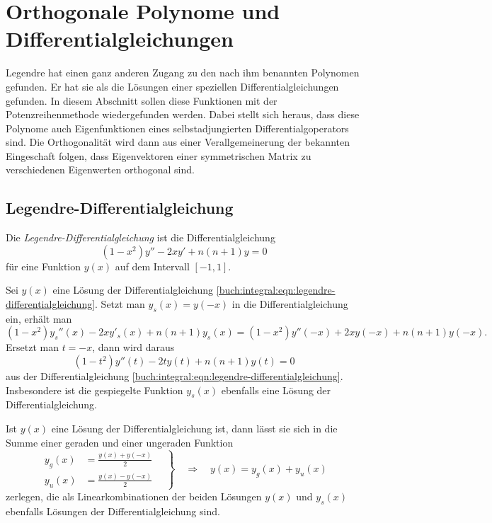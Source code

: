 %
%
%
\section{Orthogonale Polynome und Differentialgleichungen
\label{buch:orthogonal:section:orthogonale-polynome-und-dgl}}
Legendre hat einen ganz anderen Zugang zu den nach ihm benannten
Polynomen gefunden.
Er hat sie als die Lösungen einer speziellen Differentialgleichungen
gefunden.
In diesem Abschnitt sollen diese Funktionen mit der Potenzreihenmethode
wiedergefunden werden.
Dabei stellt sich heraus, dass diese Polynome auch Eigenfunktionen eines
selbstadjungierten Differentialgoperators sind.
Die Orthogonalität wird dann aus einer Verallgemeinerung der bekannten
Eingeschaft folgen, dass Eigenvektoren einer symmetrischen Matrix zu 
verschiedenen Eigenwerten orthogonal sind.

%
%
\subsection{Legendre-Differentialgleichung}
Die {\em Legendre-Differentialgleichung} ist die Differentialgleichung
%
%
\begin{equation}
(1-x^2) y'' - 2x y' + n(n+1) y = 0
\label{buch:integral:eqn:legendre-differentialgleichung}
\end{equation}
für eine Funktion $y(x)$ auf dem Intervall $[-1,1]$.

Sei $y(x)$ eine Lösung der Differentialgleichung
\eqref{buch:integral:eqn:legendre-differentialgleichung}.
Setzt man $y_s(x)=y(-x)$ in die Differentialgleichung ein, erhält
man
\[
(1-x^2)y_s''(x) - 2x y'_s(x) + n(n+1)y_s(x)
=
(1-x^2)y''(-x) +2x y(-x) +n(n+1)y(-x).
\]
Ersetzt man $t=-x$, dann wird daraus
\[
(1-t^2)y''(t) -2t y(t) + n(n+1) y(t) = 0
\]
aus der Differentialgleichung
\eqref{buch:integral:eqn:legendre-differentialgleichung}.
Insbesondere ist die gespiegelte Funktion $y_s(x)$ ebenfalls
eine Lösung der Differentialgleichung.

Ist $y(x)$ eine Lösung der Differentialgleichung ist, dann lässt
sie sich in die Summe einer geraden und einer ungeraden Funktion
\[
\left.
\begin{aligned}
y_g(x) &= \frac{y(x)+y(-x)}{2}\\
y_u(x) &= \frac{y(x)-y(-x)}{2}
\end{aligned}
\quad
\right\}
\quad
\Rightarrow
\quad
y(x) = y_g(x) + y_u(x)
\]
zerlegen, die als Linearkombinationen der beiden Lösungen
$y(x)$ und $y_s(x)$ ebenfalls Lösungen der Differentialgleichung
sind.

